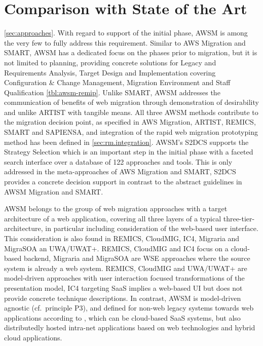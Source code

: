 \hypertarget{comparison-with-state-of-the-art}{%
\section{Comparison with State of the Art}\label{comparison-with-state-of-the-art}}


\cref{sec:approaches}.
With regard to support of the initial phase, AWSM is among the very few to fully address this requirement.
Similar to AWS Migration and SMART, AWSM has a dedicated focus on the phases prior to migration, but it is not limited to planning, providing concrete solutions for Legacy and Requirements Analysis, Target Design and Implementation covering Configuration \& Change Management, Migration Environment and Staff Qualification \cref{tbl:awsm-remip}.
Unlike SMART, AWSM addresses the communication of benefits of web migration through demonstration of desirability and unlike ARTIST with tangible means.
All three AWSM methods contribute to the migration decision point, as specified in AWS Migration, ARTIST, REMICS, SMART and SAPIENSA, and integration of the rapid web migration prototyping method has been defined in \cref{sec:rm.integration}.
AWSM's S2DCS supports the Strategy Selection \autocite{Sneed2010ReMiP} which is an important step in the initial phase with a faceted search interface over a database of 122 approaches and tools.
This is only addressed in the meta-approaches of AWS Migration and SMART, S2DCS provides a concrete decision support in contrast to the abstract guidelines in AWSM Migration and SMART.

AWSM belongs to the group of web migration approaches with a target architecture of a web application, covering all three layers of a typical three-tier-architecture, in particular including consideration of the web-based user interface.
This consideration is also found in REMICS, CloudMIG, IC4, Migraria and MigraSOA an UWA/UWAT+.
REMICS, CloudMIG and IC4 focus on a cloud-based backend, Migraria and MigraSOA are WSE approaches where the source system is already a web system.
REMICS, CloudMIG and UWA/UWAT+ are model-driven approaches with user interaction focused transformations of the presentation model, IC4 targeting SaaS implies a web-based UI but does not provide concrete technique descriptions.
In contrast, AWSM is model-driven agnostic (cf.~principle P3), and defined for non-web legacy systems towards web applications according to \autocite{def:webapplication}, which can be cloud-based SaaS systems, but also distributedly hosted intra-net applications based on web technologies and hybrid cloud applications.

